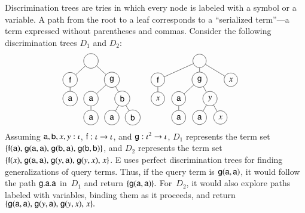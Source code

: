 Discrimination trees \cite{mcc-92-pdts} are tries in which every
node is labeled with a symbol or a variable. A path from the root to
a leaf corresponds to a ``serialized term''---a term expressed without
parentheses and commas. Consider the following discrimination trees $D_1$ and
$D_2$:
%
\begin{align*}
 & \vcenter{\hbox{\begin{tikzpicture}[level distance=2.25em, sibling distance=5em,
  every node/.style = {shape=circle, minimum size=1.75em, draw, align=center}]
  \node {\phantom{x}}
    child { node {$\cst{f}$}
      child { node %
        {$\cst{a}$} }
    }
    child { node %
      {$\cst{g}$}
      child { node {$\cst{a}$}
        child { node %
          {$\cst{a}$} }
      }
      child[sibling distance=2.5em] { node {$\cst{b}$}
        child { node %
          {$\cst{a}$} }
        child { node %
          {$\cst{b}$} }
      }
    }
    ;
\end{tikzpicture}
}}
&&
  \vcenter{\hbox{\begin{tikzpicture}[level distance=2.25em, sibling distance=5em,
  every node/.style = {shape=circle,
    draw, align=center}]
  \node {\phantom{x}}
    child { node {$\cst{f}$}
      child { node %
        {$x$} }
    }
    child { node %
      {$\cst{g}$}
      child { node {$\cst{a}$}
        child { node %
          {$\cst{a}$} }
      }
      child[sibling distance=2.5em] { node {$y$}
        child { node %
          {$\cst{a}$} }
        child { node %
          {$x$} }
      }
    }
    child[sibling distance=3.75em] { node {$x$} }
    ;
\end{tikzpicture}
}}
\end{align*}
%
Assuming $\mathsf{a}, \mathsf{b}, x, y : \iota$, $\mathsf{f} : \iota \to \iota$,
and $\mathsf{g} : \iota^2 \to \iota$,
$D_1$ represents the term set
$\{
\mathsf{f}(\mathsf{a})
{,}\allowbreak\;
\mathsf{g}(\mathsf{a}, \mathsf{a})
{,}\allowbreak\;
\mathsf{g}(\mathsf{b}, \mathsf{a})
{,}\allowbreak\;
\mathsf{g}(\mathsf{b}, \mathsf{b})
\}$,
and $D_2$ represents the term set
$\{
\mathsf{f}(x)
{,}\allowbreak\;
\mathsf{g}(\mathsf{a}, \mathsf{a})
{,}\allowbreak\;
\mathsf{g}(y, \mathsf{a})
{,}\allowbreak\;
\mathsf{g}(y, x)
{,}\;
x
\}$.
%
E uses perfect discrimination trees for finding generalizations of
query terms. Thus, if the query term is
$\mathsf{g}(\mathsf{a}, \mathsf{a})$, it would follow the path $\mathsf{g}.\mathsf{a}.\mathsf{a}$
in~$D_1$ and return $\{\mathsf{g}(\mathsf{a}, \mathsf{a})\}.$
For~$D_2$, it would also explore paths labeled with
variables, binding them as it proceeds, and return $\{
\mathsf{g}(\mathsf{a}, \mathsf{a}){,}\allowbreak\; \mathsf{g}(y, \mathsf{a}){,}\allowbreak\; \mathsf{g}(y, x){,}\; x \}.$


